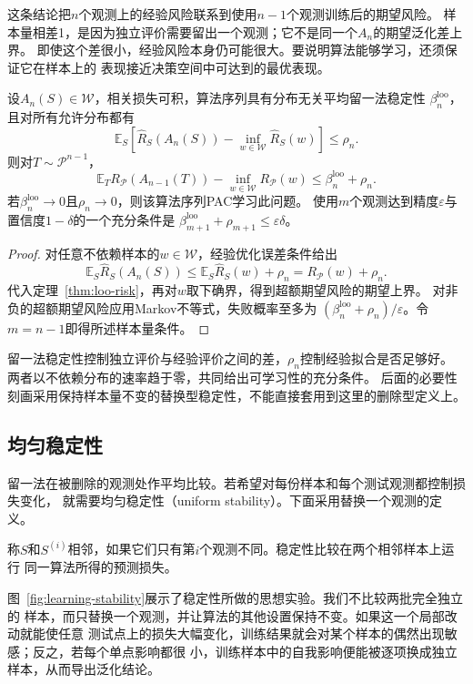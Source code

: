 这条结论把$n$个观测上的经验风险联系到使用$n-1$个观测训练后的期望风险。
样本量相差1，是因为独立评价需要留出一个观测；它不是同一个$A_n$的期望泛化差上界。
即使这个差很小，经验风险本身仍可能很大。要说明算法能够学习，还须保证它在样本上的
表现接近决策空间中可达到的最优表现。

\begin{theorem}[留一法稳定性与可学习性]
\label{thm:loo-learning}
设$A_n(S)\in\mathcal W$，相关损失可积，算法序列具有分布无关平均留一法稳定性
$\beta_n^{\mathrm{loo}}$，且对所有允许分布都有
\[
 \mathbb E_S\left[\hat R_S(A_n(S))-\inf_{w\in\mathcal W}\hat R_S(w)\right]
 \leq\rho_n.
\]
则对$T\sim\mathcal P^{n-1}$，
\[
 \mathbb E_T R_{\mathcal P}(A_{n-1}(T))-
 \inf_{w\in\mathcal W}R_{\mathcal P}(w)
 \leq\beta_n^{\mathrm{loo}}+\rho_n.
\]
若$\beta_n^{\mathrm{loo}}\to0$且$\rho_n\to0$，则该算法序列PAC学习此问题。
使用$m$个观测达到精度$\varepsilon$与置信度$1-\delta$的一个充分条件是
$\beta_{m+1}^{\mathrm{loo}}+\rho_{m+1}\leq\varepsilon\delta$。
\end{theorem}
\begin{proof}
对任意不依赖样本的$w\in\mathcal W$，经验优化误差条件给出
\[
 \mathbb E_S\hat R_S(A_n(S))
 \leq\mathbb E_S\hat R_S(w)+\rho_n=R_{\mathcal P}(w)+\rho_n.
\]
代入定理~\ref{thm:loo-risk}，再对$w$取下确界，得到超额期望风险的期望上界。
对非负的超额期望风险应用Markov不等式，失败概率至多为
$(\beta_n^{\mathrm{loo}}+\rho_n)/\varepsilon$。令$m=n-1$即得所述样本量条件。
\end{proof}

留一法稳定性控制独立评价与经验评价之间的差，$\rho_n$控制经验拟合是否足够好。
两者以不依赖分布的速率趋于零，共同给出可学习性的充分条件。
后面的必要性刻画采用保持样本量不变的替换型稳定性，不能直接套用到这里的删除型定义上。

\subsection{均匀稳定性}
\label{sec:stability-characterization}

留一法在被删除的观测处作平均比较。若希望对每份样本和每个测试观测都控制损失变化，
就需要均匀稳定性（uniform stability）。下面采用替换一个观测的定义。

称$S$和$S^{(i)}$相邻，如果它们只有第$i$个观测不同。稳定性比较在两个相邻样本上运行
同一算法所得的预测损失。

图~\ref{fig:learning-stability}展示了稳定性所做的思想实验。我们不比较两批完全独立的
样本，而只替换一个观测，并让算法的其他设置保持不变。如果这一个局部改动就能使任意
测试点上的损失大幅变化，训练结果就会对某个样本的偶然出现敏感；反之，若每个单点影响都很
小，训练样本中的自我影响便能被逐项换成独立样本，从而导出泛化结论。

